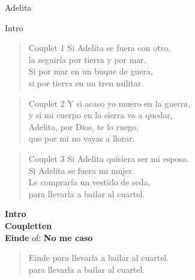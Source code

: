 \begin{song}{Adelita}

\begin{instrumental}{Intro}
 \measure{}  \measure{}  \measure{}  
 \measure{}  \measure{}  \measure{}  
\end{instrumental}

\begin{verse}{Couplet 1}
Si Adelita se fuera con otro,\\
la seguir\'ia por tierra y por mar.\\
Si por mar en un buque de guera,\\
si por tierra en un tren militar.\\
\end{verse}

\begin{verse}{Couplet 2}
Y si acaso yo muero en la guerra,\\
y si mi cuerpo en la sierra va a quedar,\\
Adelita, por Dios, te lo ruego,\\
que por mi no vayas a llorar.\\
\end{verse}

\begin{verse}{Couplet 3}
Si Adelita quisiera ser mi esposa.\\
Si Adelita se fuera mi mujer.\\
Le comprar\'ia un vestido de seda,\\
para llevarla a bailar al cuartel.\\
\end{verse}

\textbf {Intro} \\
\textbf {Coupletten}\\
\vspace{1.25ex}
\textbf{Einde} of: \textbf{ No me caso}\\
\begin{verse}{Einde}
para llevarla a bailar al cuartel.\\
para llevarla a bailar al cuartel.\\
\end{verse}
\end{song}